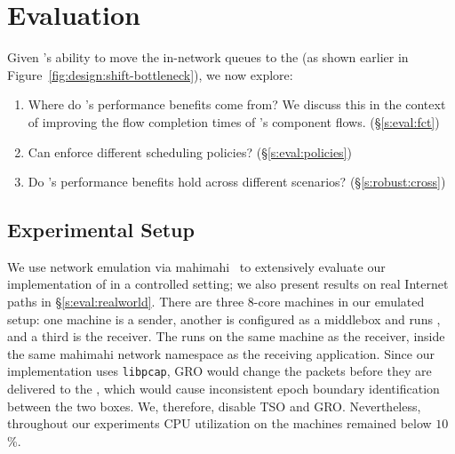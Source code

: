 \section{Evaluation}\label{s:eval}

Given \name's ability to move the in-network queues to the \inbox (as shown earlier in Figure~\ref{fig:design:shift-bottleneck}), we now explore:
\begin{enumerate}[leftmargin=15pt]
    \item Where do \name's performance benefits come from? We discuss this in the context of improving the flow completion times of \name's component flows. (\S\ref{s:eval:fct})
    \item Can \name enforce different scheduling policies? (\S\ref{s:eval:policies})
    \item Do \name's performance benefits hold across different scenarios? (\S\ref{s:robust:cross})
\end{enumerate}


\subsection{Experimental Setup}\label{s:eval:setup}

We use network emulation via mahimahi~\cite{mahimahi} to extensively evaluate our implementation of \name in a controlled setting; we also present results on real Internet paths in \S\ref{s:eval:realworld}.
There are three $8$-core machines in our emulated setup: one machine is a sender, another is configured as a middlebox and runs \inbox, and a third is the receiver. The \outbox runs on the same machine as the receiver, inside the same mahimahi network namespace as the receiving application. 
Since our \outbox implementation uses \texttt{libpcap}, GRO would change the packets before they are delivered to the \outbox, which would cause inconsistent epoch boundary identification between the two boxes. We, therefore, disable TSO and GRO.
Nevertheless, throughout our experiments CPU utilization on the machines remained below $10$\%.


